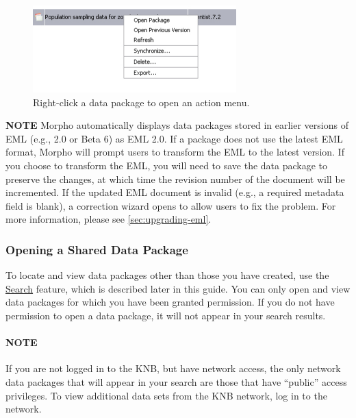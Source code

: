 \begin{figure}
  \centering
    \includegraphics[width=0.7\textwidth]{images/menu-dp-rightclick.jpg}
  \caption{Right-click a data package to open an action menu.}
  \label{fig:menu-dp-rightclick}
\end{figure}

\begin{shaded}
  \textbf{NOTE} Morpho automatically displays data packages stored in
  earlier versions of EML (e.g., 2.0 or Beta 6) as EML 2.0. If a package
  does not use the latest EML format, Morpho will prompt users to
  transform the EML to the latest version. If you choose to transform
  the EML, you will need to save the data package to preserve the
  changes, at which time the revision number of the document will be
  incremented. If the updated EML document is invalid (e.g., a required
  metadata field is blank), a correction wizard opens to allow users to
  fix the problem. For more information, please see
  \autoref{sec:upgrading-eml}.
\end{shaded}

\subsubsection{Opening a Shared Data Package}

To locate and view data packages other than those you have created, use
the \hyperref[sec:searching]{Search} feature, which is described later
in this guide. You can only open and view data packages for which you
have been granted permission. If you do not have permission to open a
data package, it will not appear in your search results. 

\paragraph{NOTE}
If you are not logged in to the KNB, but have network access, the only
network data packages that will appear in your search are those that
have ``public'' access privileges. To view additional data sets from the
KNB network, log in to the network.

